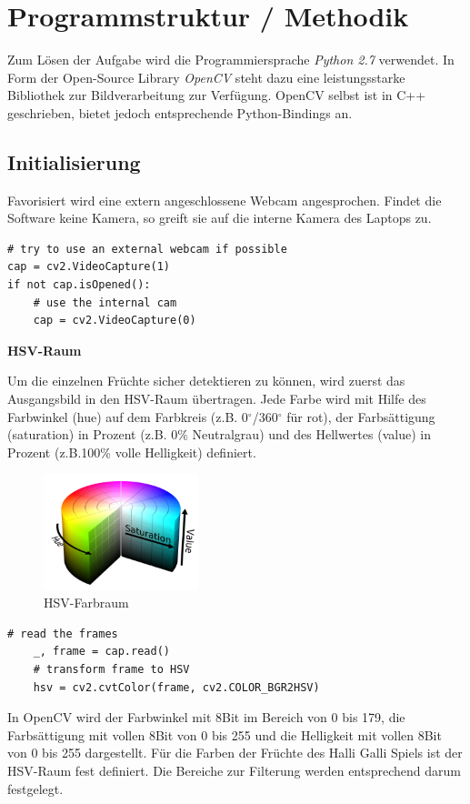 
\section{Programmstruktur / Methodik}
\label{sec:Programmstruktur}

Zum Lösen der Aufgabe wird die Programmiersprache \emph{Python 2.7} verwendet. In Form der Open-Source Library \emph{OpenCV} steht dazu eine leistungsstarke Bibliothek zur Bildverarbeitung zur Verfügung.
OpenCV selbst ist in C++ geschrieben, bietet jedoch entsprechende Python-Bindings an.


\subsection{Initialisierung}

Favorisiert wird eine extern angeschlossene Webcam angesprochen. Findet die Software keine Kamera, so greift sie auf die interne Kamera des Laptops zu. 

\lstset{language=Python}
\begin{lstlisting}[]
# try to use an external webcam if possible
cap = cv2.VideoCapture(1)
if not cap.isOpened():
    # use the internal cam
    cap = cv2.VideoCapture(0)
\end{lstlisting}

\textbf{HSV-Raum}

Um die einzelnen Früchte sicher detektieren zu können, wird zuerst das Ausgangsbild in den HSV-Raum übertragen. Jede Farbe wird mit Hilfe des Farbwinkel (hue) auf dem Farbkreis (z.B. 0$^\circ$/360$^\circ$  für rot), der Farbsättigung (saturation) in Prozent (z.B. 0\% Neutralgrau) und des Hellwertes (value) in Prozent (z.B.100\% volle Helligkeit) definiert.
\begin{figure}[H]
    \centering
    \includegraphics[width=0.4\textwidth]{Abbildungen/HSV_color}
    \caption[HSV]{HSV-Farbraum}
    \label{fig:HSV-Farbraum}
\end{figure}
\lstset{language=Python}
\begin{lstlisting}[]
    # read the frames
    _, frame = cap.read()
    # transform frame to HSV
    hsv = cv2.cvtColor(frame, cv2.COLOR_BGR2HSV)
\end{lstlisting}
In OpenCV wird der Farbwinkel mit 8Bit im Bereich von 0 bis 179, die Farbsättigung mit vollen 8Bit von 0 bis 255 und die Helligkeit mit vollen 8Bit von 0 bis 255 dargestellt.
Für die Farben der Früchte des Halli Galli Spiels ist der HSV-Raum fest definiert. Die Bereiche zur Filterung werden entsprechend darum festgelegt. 

